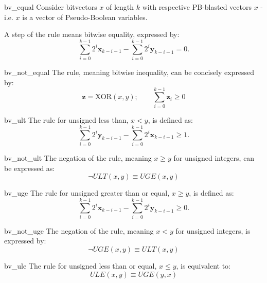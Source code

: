 \begin{RuleDescription}{bv_equal}
    Consider bitvectors $x$ of length $k$ with respective PB-blasted vectors $x$
    - i.e. $x$ is a vector of Pseudo-Boolean variables.

    A step of the \currule{} rule means bitwise equality, expressed by:
    \[
        \sum_{i=0}^{k-1} 2^i\mathbf{x}_{k-i-1} - \sum_{i=0}^{k-1} 2^i\mathbf{y}_{k-i-1} = 0.
    \]
\end{RuleDescription}

\begin{RuleDescription}{bv_not_equal}
    The \currule{} rule, meaning bitwise inequality, can be concisely expressed by:
    \[
        \mathbf{z} = \text{XOR}(x, y); \qquad \sum_{i=0}^{k-1} \mathbf{z}_i \geq 0
    \]
\end{RuleDescription}

\begin{RuleDescription}{bv_ult}
    The \currule{} rule for unsigned less than, $x < y$, is defined as:
    \[
        \sum_{i=0}^{k-1} 2^i\mathbf{y}_{k-i-1} - \sum_{i=0}^{k-1} 2^i\mathbf{x}_{k-i-1} \geq 1.
    \]
\end{RuleDescription}

\begin{RuleDescription}{bv_not_ult}
    The negation of the \currule{} rule, meaning $x \geq y$ for unsigned integers, can be expressed as:
    \[
        \neg ULT(x, y) \equiv UGE(x, y)
    \]
\end{RuleDescription}

\begin{RuleDescription}{bv_uge}
    The \currule{} rule for unsigned greater than or equal, $x \geq y$, is defined as:
    \[
        \sum_{i=0}^{k-1} 2^i\mathbf{x}_{k-i-1} - \sum_{i=0}^{k-1} 2^i\mathbf{y}_{k-i-1} \geq 0.
    \]
\end{RuleDescription}

\begin{RuleDescription}{bv_not_uge}
    The negation of the \currule{} rule, meaning $x < y$ for unsigned integers, is expressed by:
    \[
        \neg UGE(x, y) \equiv ULT(x, y)
    \]
\end{RuleDescription}

\begin{RuleDescription}{bv_ule}
    The \currule{} rule for unsigned less than or equal, $x \leq y$, is equivalent to:
    \[
        ULE(x, y) \equiv UGE(y, x)
    \]
\end{RuleDescription}

